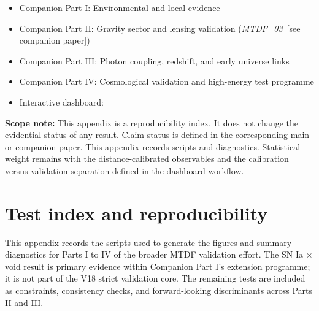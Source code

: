 \documentclass[11pt,a4paper]{article}
\begin{document}
\begin{itemize}
  \item Companion Part I: Environmental and local evidence
  \item Companion Part II: Gravity sector and lensing validation (\textit{MTDF\_\allowbreak{}03}~[see companion paper])
  \item Companion Part III: Photon coupling, redshift, and early universe links
  \item Companion Part IV: Cosmological validation and high-energy test programme
  \item Interactive dashboard: {\small\protect{}}
\end{itemize}

\begin{mdframed}[linecolor=accent,linewidth=0.5pt,backgroundcolor=callout-bg,leftline=true,rightline=true,topline=true,bottomline=true,innerleftmargin=8pt,innerrightmargin=8pt,innertopmargin=6pt,innerbottommargin=6pt]
\textbf{Scope note:}
    This appendix is a reproducibility index. It does not change the evidential status of any result. Claim status is defined in the corresponding main or companion paper. This appendix records scripts and diagnostics. Statistical weight remains with the distance-calibrated observables and the calibration versus validation separation defined in the dashboard workflow.
\end{mdframed}

\section{Test index and reproducibility}
\label{sec:appendix-a}
This appendix records the scripts used to generate the figures and summary diagnostics for Parts I to IV of the broader MTDF validation effort.
The SN Ia $\times$ void result is primary evidence within Companion Part I's extension programme; it is not part of the V18 strict validation core. The remaining tests are included as constraints, consistency checks, and forward-looking discriminants across Parts II and III.
\end{document}
